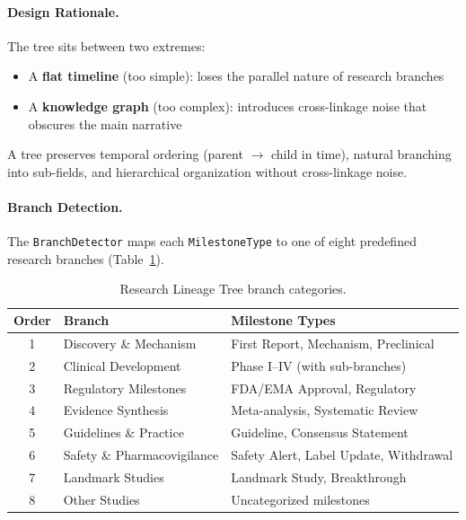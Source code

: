 \documentclass[11pt,a4paper]{article}
\begin{document}
\paragraph{Design Rationale.}
The tree sits between two extremes:
\begin{itemize}
    \item A \textbf{flat timeline} (too simple): loses the parallel nature of research branches
    \item A \textbf{knowledge graph} (too complex): introduces cross-linkage noise that obscures the main narrative
\end{itemize}

A tree preserves temporal ordering (parent $\rightarrow$ child in time), natural branching into sub-fields, and hierarchical organization without cross-linkage noise.

\paragraph{Branch Detection.}
The \texttt{BranchDetector} maps each \texttt{MilestoneType} to one of eight predefined research branches (Table~\ref{tab:branches}).

\begin{table}[htbp]
\centering
\caption{Research Lineage Tree branch categories.}
\label{tab:branches}
\begin{tabular}{clp{5cm}}
\toprule
\textbf{Order} & \textbf{Branch} & \textbf{Milestone Types} \\
\midrule
1 & Discovery \& Mechanism      & First Report, Mechanism, Preclinical \\
2 & Clinical Development        & Phase I--IV (with sub-branches) \\
3 & Regulatory Milestones       & FDA/EMA Approval, Regulatory \\
4 & Evidence Synthesis           & Meta-analysis, Systematic Review \\
5 & Guidelines \& Practice      & Guideline, Consensus Statement \\
6 & Safety \& Pharmacovigilance & Safety Alert, Label Update, Withdrawal \\
7 & Landmark Studies            & Landmark Study, Breakthrough \\
8 & Other Studies               & Uncategorized milestones \\
\bottomrule
\end{tabular}
\end{table}
\end{document}
